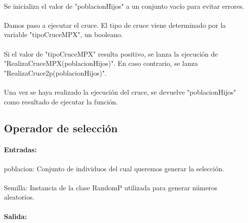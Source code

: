 	\paragraph{}Se inicializa el valor de "poblacionHijos" a un conjunto vacío para evitar errores.
	
	\paragraph{}Damos paso a ejecutar el cruce. El tipo de cruce viene determinado por la variable "tipoCruceMPX", un booleano.
	
	\paragraph{}Si el valor de "tipoCruceMPX" resulta positivo, se lanza la ejecución de "RealizaCruceMPX(poblacionHijos)". En caso contrario, se lanza "RealizaCruce2p(poblacionHijos)".
	
	\paragraph{} Una vez se haya realizado la ejecución del cruce, se devuelve "poblacionHijos" como resultado de ejecutar la función.
	
	\subsection{Operador de selección}
	
	\paragraph{Entradas:}
	
	\paragraph{}poblacion: Conjunto de individuos del cual queremos generar la selección.
	
	\paragraph{}Semilla: Instancia de la clase RandomP utilizada para generar números aleatorios.
	
	\paragraph{Salida:}
	
